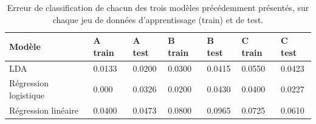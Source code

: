\documentclass[12pt,a4paper,onecolumn]{article}
\begin{document}
\begin{table}[H]
	\centering
	\begin{tabular}{|L{2cm}||C{2cm}|C{2cm}|C{2cm}|C{2cm}|C{2cm}|C{2cm}|}
		\hline {}
		Modèle                & A train & A test & B train & B test & C train & C test \\\hline
		LDA                   & 0.0133  & 0.0200 & 0.0300  & 0.0415 & 0.0550  & 0.0423 \\\hline
		Régression logistique & 0.000   & 0.0326 & 0.0200  & 0.0430 & 0.0400  & 0.0227 \\\hline
		Régression linéaire   & 0.0400  & 0.0473 & 0.0800  & 0.0965 & 0.0725  & 0.0610 \\\hline
	\end{tabular}
	\caption{Erreur de classification de chacun des trois modèles précédemment présentés, sur chaque jeu de données d'apprentissage (train) et de test.}
	\label{tab:2.4}
\end{table}
\end{document}
